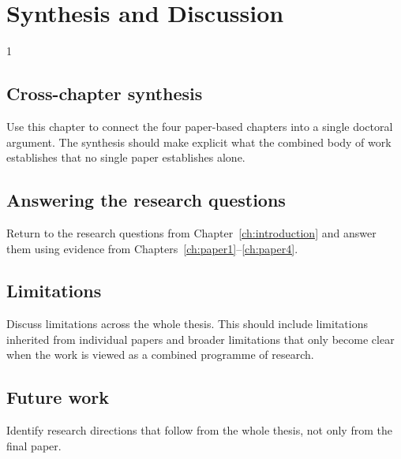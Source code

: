 \doublespacing %

\chapter{Synthesis and Discussion}
\label{ch:synthesis}

\begin{spacing}{1} %
\minitoc %
\end{spacing} %
\thesisspacing %

\section{Cross-chapter synthesis}

Use this chapter to connect the four paper-based chapters into a single doctoral argument. The synthesis should make explicit what the combined body of work establishes that no single paper establishes alone.

\section{Answering the research questions}

Return to the research questions from Chapter~\ref{ch:introduction} and answer them using evidence from Chapters~\ref{ch:paper1}--\ref{ch:paper4}.

\section{Limitations}

Discuss limitations across the whole thesis. This should include limitations inherited from individual papers and broader limitations that only become clear when the work is viewed as a combined programme of research.

\section{Future work}

Identify research directions that follow from the whole thesis, not only from the final paper.
